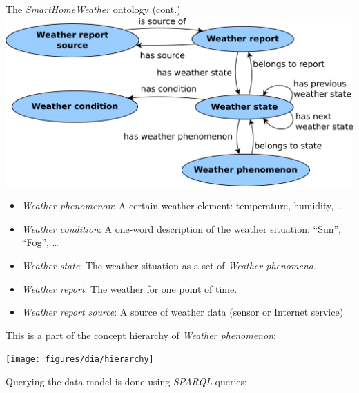 \documentclass[final,hyperref={pdfpagelabels=true}]{beamer}
\begin{document}
\begin{frame}[fragile]
\begin{columns}[t]
    \begin{column}{.45\textwidth}
      \begin{block}{The \emph{SmartHomeWeather} ontology (cont.)}
	\includegraphics[width=\textwidth-2cm]{figures/dia/binary-relations}
	\begin{itemize}
	  \item \emph{Weather phenomenon}: A certain weather
		  element: temperature, humidity, …
	  \item \emph{Weather condition}: A one-word description of the
		  weather situation: ``Sun'', ``Fog'', …
	  \item \emph{Weather state}: The weather situation as a
		  set of \emph{Weather phenomena}.
          \item \emph{Weather report}: The weather for one
		  point of time.
	  \item \emph{Weather report source}: A source of weather data
		  (sensor or Internet service)
	\end{itemize}

	\vspace{.5em}
	
	This is a part of the concept hierarchy of \emph{Weather phenomenon}:
	
	\vspace{1em}
	\texttt{[image: figures/dia/hierarchy]}

	\vspace{.5em}
	Querying the data model is done using \emph{SPARQL} queries:


\end{block}
\end{column}
\end{columns}
\end{frame}
\end{document}
